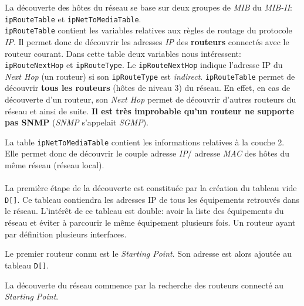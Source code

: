 La découverte des hôtes du réseau se base sur deux groupes de \emph{MIB} du \emph{MIB-II}: \texttt{ipRouteTable} et \texttt{ipNetToMediaTable}.\\
\texttt{ipRouteTable} contient les variables relatives aux règles de routage du protocole \emph{IP}. Il permet donc de découvrir les adresses \emph{IP} des \textbf{routeurs} connectés avec le routeur courant. Dans cette table deux variables nous intéressent: \texttt{ipRouteNextHop} et \texttt{ipRouteType}. Le \texttt{ipRouteNextHop} indique l'adresse IP du \emph{Next Hop} (un routeur) si son \texttt{ipRouteType} est \emph{indirect}. \texttt{ipRouteTable} permet de découvrir \textbf{tous les routeurs} (hôtes de niveau 3) du réseau. En effet, en cas de découverte d'un routeur, son \emph{Next Hop} permet de découvrir d'autres routeurs du réseau et ainsi de suite. \textbf{Il est très improbable qu'un routeur ne supporte pas SNMP} (\emph{SNMP} s'appelait \emph{SGMP}).

La table \texttt{ipNetToMediaTable} contient les informations relatives à la couche 2. Elle permet donc de découvrir le couple adresse \emph{IP}/ adresse \emph{MAC} des hôtes du même réseau (réseau local).
\paragraph{}
La première étape de la découverte est constituée par la création du tableau vide \texttt{D[]}. Ce tableau contiendra les adresses IP de tous les équipements retrouvés dans le réseau. L'intérêt de ce tableau est double: avoir la liste des équipements du réseau et éviter à parcourir le même équipement plusieurs fois. Un routeur ayant par définition plusieurs interfaces.

Le premier routeur connu est le \emph{Starting Point}. Son adresse est alors ajoutée au tableau \texttt{D[]}.

La découverte du réseau commence par la recherche des routeurs connecté au \emph{Starting Point}.


